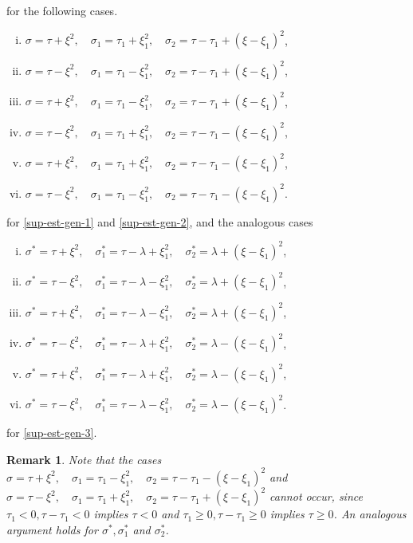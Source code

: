 \documentclass[12pt,reqno]{amsart}
\numberwithin{equation}{section}  %
\newtheorem{remark}[theorem]{Remark}
\begin{document}
%
for the following cases.
\begin{enumerate}[(i)]
    \item $ \sigma=\tau+\xi^2,\quad \sigma_1=\tau_1+\xi_1^2,\quad \sigma_2=\tau -
      \tau_1+(\xi - \xi_1)^2$,
\label{it-real-1}
    \item $ \sigma=\tau-\xi^2,\quad \sigma_1=\tau_1-\xi_1^2,\quad \sigma_2=\tau - \tau_1+(\xi - \xi_1)^2$,
\label{it-real-2}
    \item  $\sigma=\tau+\xi^2,\quad \sigma_1=\tau_1-\xi_1^2,\quad \sigma_2=\tau - \tau_1+(\xi - \xi_1)^2$,
      \label{it-real-3}
    \item $\sigma=\tau-\xi^2,\quad \sigma_1=\tau_1+\xi_1^2,\quad \sigma_2=\tau - \tau_1-(\xi - \xi_1)^2$,
\label{it-real-4}
    \item $\sigma=\tau+\xi^2,\quad \sigma_1=\tau_1+\xi_1^2,\quad \sigma_2=\tau - \tau_1-(\xi - \xi_1)^2$,
\label{it-real-5}
    \item $\sigma=\tau-\xi^2,\quad \sigma_1=\tau_1-\xi_1^2,\quad \sigma_2=\tau - \tau_1-(\xi - \xi_1)^2$.
\label{it-real-6}
\end{enumerate}
%
for \eqref{sup-est-gen-1} and \eqref{sup-est-gen-2}, and the analogous cases
%
\begin{enumerate}[(i)]
\item $ \sigma^{*}=\tau+\xi^2,\quad \sigma^{*}_1=\tau - \lambda+\xi_1^2,\quad
  \sigma^{*}_2=\lambda+(\xi - \xi_1)^2$, \label{it-1-star-real} \item $
  \sigma^{*}=\tau-\xi^2,\quad \sigma^{*}_1=\tau - \lambda-\xi_{1}^2,\quad
  \sigma^{*}_2=\lambda+(\xi - \xi_1)^2$, \label{it-2-star-real} \item
  $\sigma^{*}=\tau+\xi^2,\quad \sigma^{*}_1=\tau - \lambda-\xi_1^2,\quad
  \sigma^{*}_2=\lambda+(\xi - \xi_1)^2$, \label{it-3-star-real} \item
  $\sigma^{*}=\tau-\xi^2,\quad \sigma^{*}_1=\tau - \lambda+\xi_1^2,\quad
  \sigma^{*}_2=\lambda-(\xi - \xi_1)^2$, \label{it-4-star-real} \item
  $\sigma^{*}=\tau+\xi^2,\quad \sigma^{*}_1=\tau - \lambda+\xi_1^2,\quad
  \sigma^{*}_2=\lambda-(\xi - \xi_1)^2$, \label{it-5-star-real} \item
  $\sigma^{*}=\tau-\xi^2,\quad \sigma^{*}_1=\tau - \lambda-\xi_1^2,\quad
  \sigma^{*}_2= \lambda-(\xi - \xi_1)^2$.  \label{it-6-star-real}
  \end{enumerate}
for \eqref{sup-est-gen-3}.
%
%
\begin{framed}
\begin{remark}
Note that the cases $\sigma=\tau+\xi^2,\quad \sigma_1=\tau_1-\xi_1^2,\quad
\sigma_2=\tau - \tau_1-(\xi - \xi_1)^2$ and $\sigma=\tau-\xi^2,\quad
\sigma_1=\tau_1+\xi_1^2,\quad \sigma_2=\tau - \tau_1+(\xi - \xi_1)^2$ cannot occur, since
$\tau_1< 0, \tau-\tau_1< 0$ implies $\tau<0$ and $\tau_1\geq 0, \tau-\tau_1\geq
0$ implies $\tau\geq 0$. An analogous argument holds for $\sigma^{*},
\sigma_{1}^{*}$ and $\sigma_{2}^{*}$.
\end{remark}
\end{framed}
\end{document}
